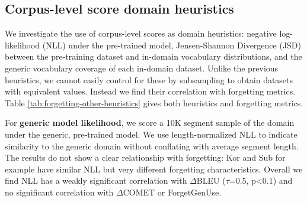 \documentclass[11pt]{article}
\begin{document}
\subsection{Corpus-level score domain heuristics}
We investigate the use of corpus-level scores as domain heuristics: negative log-likelihood (NLL) under the pre-trained model,  Jensen-Shannon Divergence (JSD) \cite{lin1991JSD} between the pre-training dataset and in-domain vocabulary distributions, and the generic vocabulary coverage of each in-domain dataset. Unlike the previous heuristics, we cannot easily control for these by subsampling to obtain datasets with equivalent values. Instead we find their correlation with forgetting metrics.  Table \ref{tab:forgetting-other-heuristics} gives both heuristics and forgetting metrics. 


For \textbf{generic model likelihood}, we score a 10K segment sample of the domain under the generic, pre-trained model. We use length-normalized  NLL to indicate similarity to the generic domain without conflating with average segment length. The results do not show a clear relationship with forgetting: Kor and Sub for example have similar NLL but very different forgetting characteristics. Overall we find  NLL has a weakly significant correlation with $\Delta$BLEU ($\tau$=0.5, p<0.1) and no significant correlation with $\Delta$COMET or ForgetGenUse. 

\label{sec:mitigating}


\end{document}
